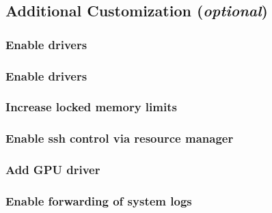 \documentclass{ohpc-doc}
\begin{document}

\subsection{Additional Customization ({\em optional})} \label{sec:addl_customizations}


\subsubsection{Enable \InfiniBand{} drivers}


\subsubsection{Enable \OmniPath{} drivers}


\subsubsection{Increase locked memory limits}


\subsubsection{Enable ssh control via resource manager}


%

%
%
%

\subsubsection{Add GPU driver}


\subsubsection{Enable forwarding of system logs} \label{sec:add_syslog}

\end{document}
